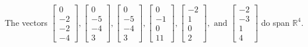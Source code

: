 \begin{exercise}
\begin{exerciseStatement}
  \end{exerciseStatement}
  \begin{exerciseAnswer}
   The vectors \(\left[\begin{array}{r}
0 \\
-2 \\
-2 \\
-4
\end{array}\right] , \left[\begin{array}{r}
0 \\
-5 \\
-4 \\
3
\end{array}\right] , \left[\begin{array}{r}
0 \\
-5 \\
-4 \\
3
\end{array}\right] , \left[\begin{array}{r}
0 \\
-1 \\
0 \\
11
\end{array}\right] , \left[\begin{array}{r}
-2 \\
1 \\
0 \\
2
\end{array}\right] , \text{ and } \left[\begin{array}{r}
-2 \\
-3 \\
1 \\
4
\end{array}\right]\) 
  	 do  
	span \(\mathbb{R}^4\).
  


  \end{exerciseAnswer}
\end{exercise}